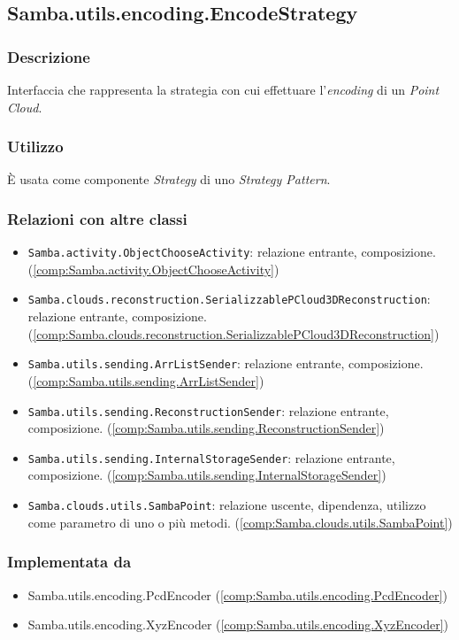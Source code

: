 \subsection{Samba.utils.encoding.EncodeStrategy}\label{comp:Samba.utils.encoding.EncodeStrategy}
\subsubsection{Descrizione}
Interfaccia che rappresenta la strategia con cui effettuare l'\emph{encoding} di un \emph{Point Cloud}.
\subsubsection{Utilizzo}
È usata come componente \emph{Strategy} di uno \emph{Strategy Pattern}.
\subsubsection{Relazioni con altre classi}
\begin{itemize}
	\item \texttt{Samba.activity.ObjectChooseActivity}: relazione entrante, composizione.   (\ref{comp:Samba.activity.ObjectChooseActivity})
	\item \texttt{Samba.clouds.reconstruction.SerializzablePCloud3DReconstruction}: relazione entrante, composizione.  (\ref{comp:Samba.clouds.reconstruction.SerializzablePCloud3DReconstruction})
	\item \texttt{Samba.utils.sending.ArrListSender}: relazione entrante, composizione. (\ref{comp:Samba.utils.sending.ArrListSender})
	\item \texttt{Samba.utils.sending.ReconstructionSender}: relazione entrante, composizione.	 (\ref{comp:Samba.utils.sending.ReconstructionSender})
	\item \texttt{Samba.utils.sending.InternalStorageSender}: relazione entrante, composizione.	 (\ref{comp:Samba.utils.sending.InternalStorageSender})
	\item \texttt{Samba.clouds.utils.SambaPoint}: relazione uscente, dipendenza, utilizzo come parametro di uno o più metodi. (\ref{comp:Samba.clouds.utils.SambaPoint})
\end{itemize}
\subsubsection{Implementata da}
\begin{itemize}
	\item Samba.utils.encoding.PcdEncoder (\ref{comp:Samba.utils.encoding.PcdEncoder})
	\item Samba.utils.encoding.XyzEncoder (\ref{comp:Samba.utils.encoding.XyzEncoder})
\end{itemize}

